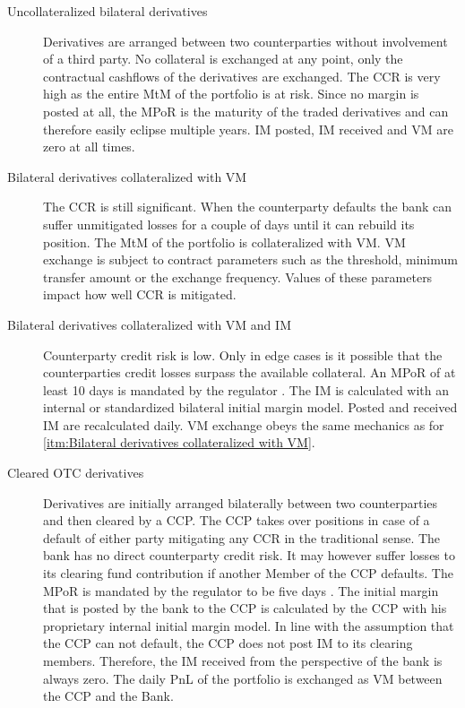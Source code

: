\documentclass[../Thesis_AHoecherl.tex]{subfiles}
\begin{document}
\begin{description}
    \item[Uncollateralized bilateral derivatives\label{itm:Uncollateralized bilateral derivatives}] 
    Derivatives are arranged between two counterparties without involvement of a third party. No collateral is exchanged at any point, only the contractual cashflows of the derivatives are exchanged. The \gls{CCR} is very high as the entire \gls{MtM} of the portfolio is at risk. Since no margin is posted at all, the \gls{MPoR} is the maturity of the traded derivatives and can therefore easily eclipse multiple years. \gls{IM} posted, \gls{IM} received and \gls{VM} are zero at all times.
    \item[Bilateral derivatives collateralized with VM\label{itm:Bilateral derivatives collateralized with VM}] 
    The \gls{CCR} is still significant. When the counterparty defaults the bank can suffer unmitigated losses for a couple of days until it can rebuild its position. The \gls{MtM} of the portfolio is collateralized with \gls{VM}. \gls{VM} exchange is subject to contract parameters such as the threshold, minimum transfer amount or the exchange frequency. Values of these parameters impact how well \gls{CCR} is mitigated.
    \item[Bilateral derivatives collateralized with \gls{VM} and \gls{IM}\label{itm:Bilateral derivatives collateralized with VM and IM}] 
    Counterparty credit risk is low. Only in edge cases is it possible that the counterparties credit losses surpass the available collateral. An \gls{MPoR} of at least 10 days is mandated by the regulator \cite[Requirement 3.1]{BCBS_MarginRequirements}. The IM is calculated with an internal or standardized bilateral initial margin model. Posted and received IM are recalculated daily. \gls{VM} exchange obeys the same mechanics as for \ref{itm:Bilateral derivatives collateralized with VM}.
    \item[Cleared OTC derivatives\label{itm:Cleared OTC derivatives}] 
    Derivatives are initially arranged bilaterally between two counterparties and then cleared by a CCP. The CCP takes over positions in case of a default of either party mitigating any \gls{CCR} in the traditional sense. The bank has no direct counterparty credit risk. It may however suffer losses to its clearing fund contribution if another Member of the CCP defaults. The \gls{MPoR} is mandated by the regulator to be five days . The initial margin that is posted by the bank to the \gls{CCP} is calculated by the \gls{CCP} with his proprietary internal initial margin model. In line with the assumption that the CCP can not default, the CCP does not post IM to its clearing members. Therefore, the IM received from the perspective of the bank is always zero. The daily \gls{PnL} of the portfolio is exchanged as VM between the CCP and the Bank. 

\end{description}
\end{document}
